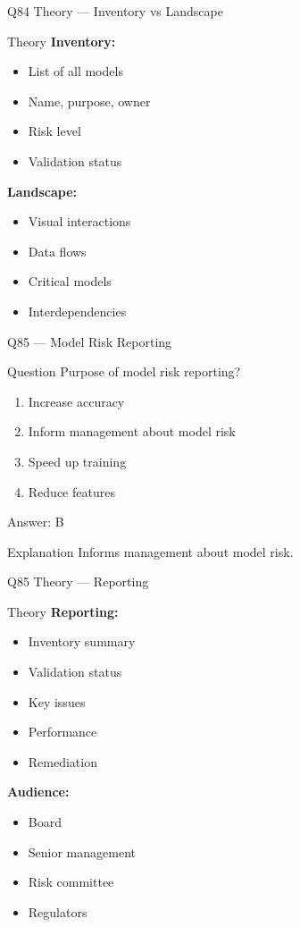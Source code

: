 \documentclass[aspectratio=169,8pt]{beamer}
\begin{document}
	\begin{frame}{Q84 Theory --- Inventory vs Landscape}
		\begin{block}{Theory}
			\textbf{Inventory:}
			\begin{itemize}
				\item List of all models
				\item Name, purpose, owner
				\item Risk level
				\item Validation status
			\end{itemize}
			\textbf{Landscape:}
			\begin{itemize}
				\item Visual interactions
				\item Data flows
				\item Critical models
				\item Interdependencies
			\end{itemize}
		\end{block}
	\end{frame}
	
	\begin{frame}{Q85 --- Model Risk Reporting}
		\begin{block}{Question}
			Purpose of model risk reporting?
		\end{block}
		\begin{enumerate}[label=\Alph*.]
			\item Increase accuracy
			\item Inform management about model risk
			\item Speed up training
			\item Reduce features
		\end{enumerate}
		\begin{exampleblock}{Answer: B}
		\end{exampleblock}
		\begin{block}{Explanation}
			Informs management about model risk.
		\end{block}
	\end{frame}
	
	\begin{frame}{Q85 Theory --- Reporting}
		\begin{block}{Theory}
			\textbf{Reporting:}
			\begin{itemize}
				\item Inventory summary
				\item Validation status
				\item Key issues
				\item Performance
				\item Remediation
			\end{itemize}
			\textbf{Audience:}
			\begin{itemize}
				\item Board
				\item Senior management
				\item Risk committee
				\item Regulators
			\end{itemize}
		\end{block}
	\end{frame}
	
\end{document}

